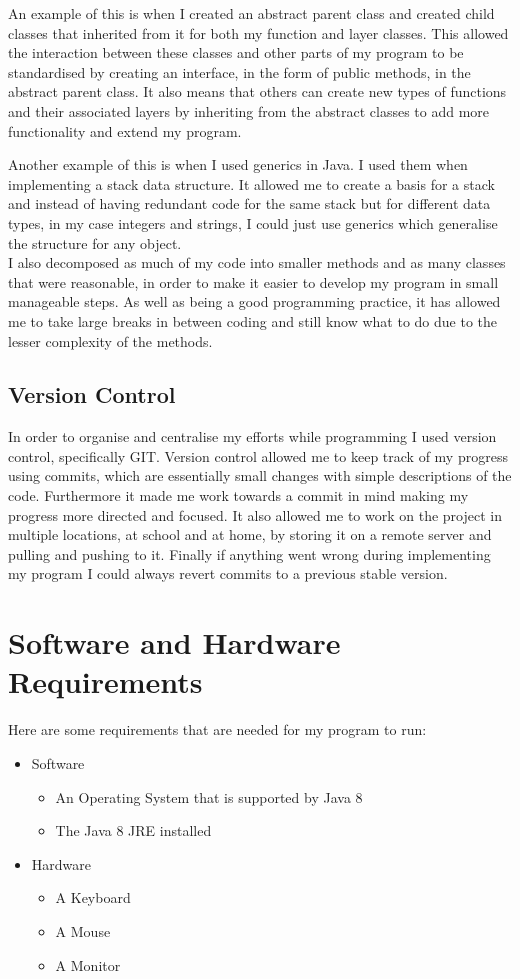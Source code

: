\documentclass[../../../main.tex]{subfiles}
\begin{document}
An example of this is when I created an abstract parent class and created child classes that inherited from it for both my function and layer classes. This allowed the interaction between these classes and other parts of my program to be standardised by creating an interface, in the form of public methods, in the abstract parent class. It also means that others can create new types of functions and their associated layers by inheriting from the abstract classes to add more functionality and extend my program.

Another example of this is when I used generics in Java. I used them when implementing a stack data structure. It allowed me to create a basis for a stack and instead of having redundant code for the same stack but for different data types, in my case integers and strings, I could just use generics which generalise the structure for any object.\\
I also decomposed as much of my code into smaller methods and as many classes that were reasonable, in order to make it easier to develop my program in small manageable steps. As well as being a good programming practice, it has allowed me to take large breaks in between coding and still know what to do due to the lesser complexity of the methods.\\

\subsection{Version Control}
In order to organise and centralise my efforts while programming I used version control, specifically GIT. Version control allowed me to keep track of my progress using commits, which are essentially small changes with simple descriptions of the code. Furthermore it made me work towards a commit in mind making my progress more directed and focused. It also allowed me to work on the project in multiple locations, at school and at home, by storing it on a remote server and pulling and pushing to it. Finally if anything went wrong during implementing my program I could always revert commits to a previous stable version.

\section{Software and Hardware Requirements}	%
Here are some requirements that are needed for my program to run:
\begin{itemize}
    \item Software
    \begin{itemize}
        \item An Operating System that is supported by Java 8
        \item The Java 8 JRE installed
    \end{itemize}
    \item Hardware
    \begin{itemize}
        \item A Keyboard
        \item A Mouse
        \item A Monitor
    \end{itemize}
\end{itemize}
\end{document}
